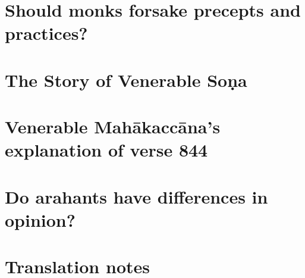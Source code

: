 \documentclass[10pt,twoside,final]{memoir}
\begin{document}
\chapter{Should monks forsake precepts and practices?}\label{should-monks-forsake}


% 

\chapter{The Story of Venerable So\d{n}a}


\chapter{Venerable Mah\=akacc\=ana's explanation of verse 844}\label{mahakaccana-v844}


\chapter{Do arahants have differences in opinion?}


\chapter{Translation notes}


\mbox{}\newpage\thispagestyle{empty}\mbox{}
\end{document}
